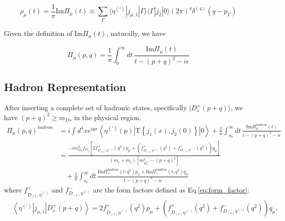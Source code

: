 \begin{equation}
    \rho_{\mu}(t) = \frac{1}{\pi} \mathrm{Im}\Pi_\mu(t) \equiv \sum_{\Gamma}^{} \langle \eta^{(\prime)}|j_{\mu,1}|\Gamma\rangle \langle \Gamma|j_{2}|0\rangle (2 \pi)^4 \delta^{(4)}\left(q-p_{\Gamma}\right)
\end{equation}

Given the definition of $\mathrm{Im}\Pi_\mu(t)$, naturally, we have

\begin{equation}
    \Pi_\mu(p, q)= \frac{1}{\pi} \int_{0}^{\infty} dt\, \frac{\mathrm{Im}\Pi_\mu(t)}{t-(p+q)^{2}-i\epsilon}
    \label{eq:dispersion_relation}
\end{equation}


\subsection{Hadron Representation}
After inserting a complete set of hadronic states, specifically $|D_{s}^{+}(p+q)\rangle$, we have $(p+q)^{2} \geq m_{Ds}$ in the physical region.
\begin{equation}
    \begin{aligned}
        \Pi_\mu(p, q)^{hadron} & = i \int d^4 x e^{i q x}\left\langle \eta^{(\prime)}(p)\left|\mathrm{T}\left\{j_{1}(x), j_{2}(0)\right\}\right| 0\right\rangle + \frac{1}{\pi}  \int_{s_0}^{\infty} dt\, \frac{\mathrm{Im}\Pi_\mu^{hadron}(t)}{t-(p+q)^{2}-i\epsilon} \\
                               & = \frac{-i m_{D_s}^2 f_{D_s}[2 f_{D_{(s)} \eta^{(\prime)}}^{+}\left(q^2\right) p_\mu+\left(f_{D_{(s)} \eta^{(\prime)}}^{+}\left(q^2\right)+f_{D_{(s)} \eta^{(\prime)}}^{-}\left(q^2\right)\right)q_\mu]}{(m_c+m_s)[m^{2}_{D_{s}^{+}} - (p+q)^{2}]} \\
                               & \quad + \frac{1}{\pi} \int_{s_0}^{\infty} dt\, \frac{\mathrm{Im}\Pi_{+}^{hadron}(t,q^{2})p_{\mu} + \mathrm{Im}\Pi_{-}^{hadron}(t,q^{2})q_{\mu}}{t-(p+q)^{2}-i\epsilon}
    \end{aligned}
    \label{eq:hadron_rep}
\end{equation}
where $f_{D_{(s)} \eta^{(\prime)}}^{+}$ and $f_{D_{(s)} \eta^{(\prime)}}^{-}$ are the form factors defined as Eq.\ref{eq:form_factor}:
\begin{equation}
    \begin{aligned}
         & \left\langle \eta^{(\prime)}|j_{\mu,1}|D_{s}^{+}(p+q)\right\rangle=2 f_{D_{(s)} \eta^{(\prime)}}^{+}\left(q^2\right) p_\mu+\left(f_{D_{(s)} \eta^{(\prime)}}^{+}\left(q^2\right)+f_{D_{(s)} \eta^{(\prime)}}^{-}\left(q^2\right)\right) q_\mu,
    \end{aligned}
    \label{eq:form_factor}
\end{equation}

